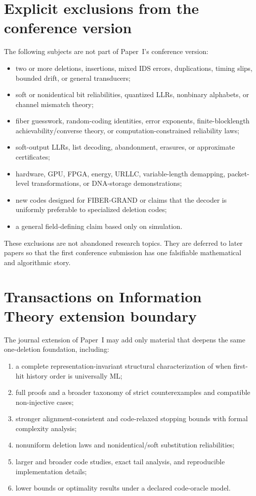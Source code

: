 \documentclass[11pt]{article}
\theoremstyle{definition}
\theoremstyle{remark}
\begin{document}
\section{Explicit exclusions from the conference version}

The following subjects are not part of Paper~I's conference version:
\begin{itemize}
  \item two or more deletions, insertions, mixed IDS errors, duplications, timing slips, bounded drift, or general transducers;
  \item soft or nonidentical bit reliabilities, quantized LLRs, nonbinary alphabets, or channel mismatch theory;
  \item fiber guesswork, random-coding identities, error exponents, finite-blocklength achievability/converse theory, or computation-constrained reliability laws;
  \item soft-output LLRs, list decoding, abandonment, erasures, or approximate certificates;
  \item hardware, GPU, FPGA, energy, URLLC, variable-length demapping, packet-level transformations, or DNA-storage demonstrations;
  \item new codes designed for FIBER-GRAND or claims that the decoder is uniformly preferable to specialized deletion codes;
  \item a general field-defining claim based only on simulation.
\end{itemize}

These exclusions are not abandoned research topics. They are deferred to later papers so that the first conference submission has one falsifiable mathematical and algorithmic story.

\section{Transactions on Information Theory extension boundary}
\label{sec:extension}

The journal extension of Paper~I may add only material that deepens the same one-deletion foundation, including:
\begin{enumerate}
  \item a complete representation-invariant structural characterization of when first-hit history order is universally ML;
  \item full proofs and a broader taxonomy of strict counterexamples and compatible non-injective cases;
  \item stronger alignment-consistent and code-relaxed stopping bounds with formal complexity analysis;
  \item nonuniform deletion laws and nonidentical/soft substitution reliabilities;
  \item larger and broader code studies, exact tail analysis, and reproducible implementation details;
  \item lower bounds or optimality results under a declared code-oracle model.
\end{enumerate}
\end{document}
